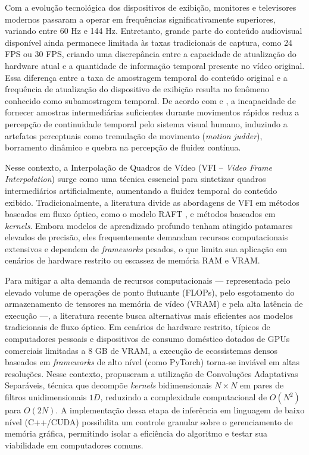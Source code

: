 \documentclass[
    12pt,                %
    openright,           %
    oneside,             %
    a4paper,             %
    english,             %
    brazil               %
]{abntex2}
\begin{document}
Com a evolução tecnológica dos dispositivos de exibição, monitores e televisores modernos passaram a operar em frequências significativamente superiores, variando entre 60 Hz e 144 Hz. Entretanto, grande parte do conteúdo audiovisual disponível ainda permanece limitada às taxas tradicionais de captura, como 24 FPS ou 30 FPS, criando uma discrepância entre a capacidade de atualização do hardware atual e a quantidade de informação temporal presente no vídeo original. Essa diferença entre a taxa de amostragem temporal do conteúdo original e a frequência de atualização do dispositivo de exibição resulta no fenômeno conhecido como subamostragem temporal. De acordo com  e , a incapacidade de fornecer amostras intermediárias suficientes durante movimentos rápidos reduz a percepção de continuidade temporal pelo sistema visual humano, induzindo a artefatos perceptuais como tremulação de movimento (\textit{motion judder}), borramento dinâmico e quebra na percepção de fluidez contínua.

Nesse contexto, a Interpolação de Quadros de Vídeo (VFI -- \textit{Video Frame Interpolation}) surge como uma técnica essencial para sintetizar quadros intermediários artificialmente, aumentando a fluidez temporal do conteúdo exibido. Tradicionalmente, a literatura divide as abordagens de VFI em métodos baseados em fluxo óptico, como o modelo RAFT \cite{Teed2020}, e métodos baseados em \textit{kernels}. Embora modelos de aprendizado profundo tenham atingido patamares elevados de precisão, eles frequentemente demandam recursos computacionais extensivos e dependem de \textit{frameworks} pesados, o que limita sua aplicação em cenários de hardware restrito ou escassez de memória RAM e VRAM.

Para mitigar a alta demanda de recursos computacionais --- representada pelo elevado volume de operações de ponto flutuante (FLOPs), pelo esgotamento do armazenamento de tensores na memória de vídeo (VRAM) e pela alta latência de execução ---, a literatura recente busca alternativas mais eficientes aos modelos tradicionais de fluxo óptico. Em cenários de hardware restrito, típicos de computadores pessoais e dispositivos de consumo doméstico dotados de GPUs comerciais limitadas a 8 GB de VRAM, a execução de ecossistemas densos baseados em \textit{frameworks} de alto nível (como PyTorch) torna-se inviável em altas resoluções. Nesse contexto,  propuseram a utilização de Convoluções Adaptativas Separáveis, técnica que decompõe \textit{kernels} bidimensionais $N \times N$ em pares de filtros unidimensionais $1D$, reduzindo a complexidade computacional de $O(N^2)$ para $O(2N)$. A implementação dessa etapa de inferência em linguagem de baixo nível (C++/CUDA) possibilita um controle granular sobre o gerenciamento de memória gráfica, permitindo isolar a eficiência do algoritmo e testar sua viabilidade em computadores comuns.
\end{document}

